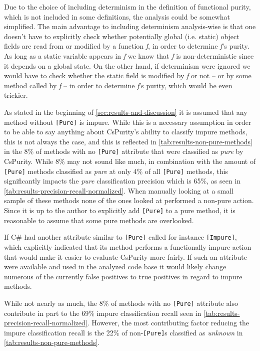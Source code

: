 \documentclass[a4paper,12pt]{article}
\begin{document}
Due to the choice of including determinism in the definition of functional purity, which is not included in some definitions, the analysis could be somewhat simplified. The main advantage to including determinism analysis-wise is that one doesn't have to explicitly check whether potentially global (i.e. static) object fields are read from or modified by a function \textit{f}, in order to determine \textit{f}'s purity. As long as a static variable appears in \textit{f} we know that \textit{f} is non-deterministic since it depends on a global state. On the other hand, if determinism were ignored we would have to check whether the static field is modified by \textit{f} or not -- or by some method called by \textit{f} -- in order to determine \textit{f}'s purity, which would be even trickier.

As stated in the beginning of \autoref{sec:results-and-discussion} it is assumed that any method without \texttt{[Pure]} is impure. While this is a necessary assumption in order to be able to say anything about CsPurity's ability to classify impure methods, this is not always the case, and this is reflected in \autoref{tab:results-non-pure-methods} in the 8\% of methods with no \texttt{[Pure]} attribute that were classified as \textit{pure} by CsPurity. While 8\% may not sound like much, in combination with the amount of \texttt{[Pure]} methods classified as \textit{pure} at only 4\% of all \texttt{[Pure]} methods, this significantly impacts the \textit{pure} classification precision which is 65\%, as seen in \autoref{tab:results-precision-recall-normalized}. When manually looking at a small sample of these methods none of the ones looked at performed a non-pure action. Since it is up to the author to explicitly add \texttt{[Pure]} to a pure method, it is reasonable to assume that some pure methods are overlooked.

If C\# had another attribute similar to \texttt{[Pure]} called for instance \texttt{[Impure]}, which explicitly indicated that its method performs a functionally impure action that would make it easier to evaluate CsPurity more fairly. If such an attribute were available and used in the analyzed code base it would likely change numerous of the currently false positives to true positives in regard to impure methods. %

While not nearly as much, the 8\% of methods with no \texttt{[Pure]} attribute also contribute in part to the 69\% impure classification recall seen in \autoref{tab:results-precision-recall-normalized}. However, the most contributing factor reducing the impure classification recall is the 22\% of non-\texttt{[Pure]}s classified as \textit{unknown} in \autoref{tab:results-non-pure-methods}.
\end{document}
